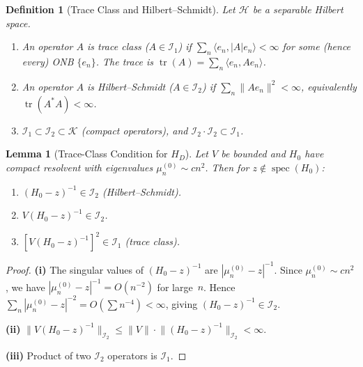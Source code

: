 \documentclass[11pt,a4paper]{article}
\theoremstyle{plain}
\newtheorem{lemma}[theorem]{Lemma}
\newtheorem{definition}[theorem]{Definition}
\theoremstyle{remark}
\newcommand{\HH}{\mathcal{H}}
\DeclareMathOperator{\tr}{tr}
\DeclareMathOperator{\spec}{spec}
\newcommand{\norm}[1]{\lVert #1 \rVert}
\begin{document}
\begin{definition}[Trace Class and Hilbert--Schmidt]\label{def:trace-class}
Let $\HH$ be a separable Hilbert space.
\begin{enumerate}[nosep,label=(\roman*)]
  \item An operator $A$ is \emph{trace class} ($A\in\mathcal{I}_1$)
        if $\sum_n\langle e_n,|A|e_n\rangle<\infty$ for some (hence every)
        ONB $\{e_n\}$.  The trace is $\tr(A)=\sum_n\langle e_n,Ae_n\rangle$.
  \item An operator $A$ is \emph{Hilbert--Schmidt} ($A\in\mathcal{I}_2$)
        if $\sum_n\norm{Ae_n}^2<\infty$, equivalently $\tr(A^*A)<\infty$.
  \item $\mathcal{I}_1\subset\mathcal{I}_2\subset\mathcal{K}$ (compact operators),
        and $\mathcal{I}_2\cdot\mathcal{I}_2\subset\mathcal{I}_1$.
\end{enumerate}
\end{definition}

\begin{lemma}[Trace-Class Condition for $H_D$]\label{lem:trace-class-check}
Let $V$ be bounded and $H_0$ have compact resolvent with eigenvalues
$\mu_n^{(0)}\sim cn^2$.  Then for $z\notin\spec(H_0)$:
\begin{enumerate}[nosep,label=(\roman*)]
  \item $(H_0-z)^{-1}\in\mathcal{I}_2$ (Hilbert--Schmidt).
  \item $V(H_0-z)^{-1}\in\mathcal{I}_2$.
  \item $[V(H_0-z)^{-1}]^2\in\mathcal{I}_1$ (trace class).
\end{enumerate}
\end{lemma}

\begin{proof}
\textbf{(i)} The singular values of $(H_0-z)^{-1}$ are
$|\mu_n^{(0)}-z|^{-1}$.  Since $\mu_n^{(0)}\sim cn^2$, we have
$|\mu_n^{(0)}-z|^{-1}=O(n^{-2})$ for large~$n$.  Hence
$\sum_n|\mu_n^{(0)}-z|^{-2}=O(\sum n^{-4})<\infty$, giving
$(H_0-z)^{-1}\in\mathcal{I}_2$.

\textbf{(ii)} $\norm{V(H_0-z)^{-1}}_{\mathcal{I}_2}
\leq\norm{V}\cdot\norm{(H_0-z)^{-1}}_{\mathcal{I}_2}<\infty$.

\textbf{(iii)} Product of two $\mathcal{I}_2$ operators is $\mathcal{I}_1$.
\end{proof}
\end{document}
